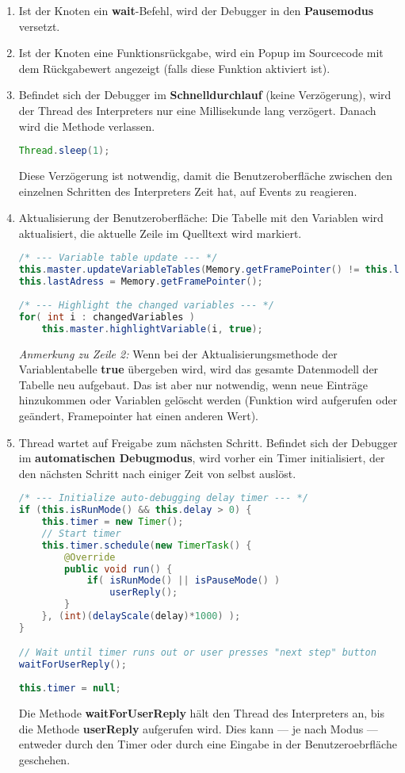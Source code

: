 \begin{enumerate}
\item Ist der Knoten ein \textbf{wait}-Befehl, wird der Debugger in den \textbf{Pausemodus} versetzt.
\item Ist der Knoten eine Funktionsrückgabe, wird ein Popup im Sourcecode mit dem Rückgabewert angezeigt (falls diese Funktion aktiviert ist).
\item Befindet sich der Debugger im \textbf{Schnelldurchlauf} (keine Verzögerung), wird der Thread des Interpreters nur eine Millisekunde lang verzögert. Danach wird die Methode verlassen.
\begin{lstlisting}[language=JAVA]
Thread.sleep(1);
\end{lstlisting}
Diese Verzögerung ist notwendig, damit die Benutzeroberfläche zwischen den einzelnen Schritten des Interpreters Zeit hat, auf Events zu reagieren.

\item Aktualisierung der Benutzeroberfläche: Die Tabelle mit den Variablen wird aktualisiert, die aktuelle Zeile im Quelltext wird markiert.
\begin{lstlisting}[language=JAVA]
/* --- Variable table update --- */
this.master.updateVariableTables(Memory.getFramePointer() != this.lastAdress);
this.lastAdress = Memory.getFramePointer();
		
/* --- Highlight the changed variables --- */
for( int i : changedVariables )
	this.master.highlightVariable(i, true);
\end{lstlisting}
\emph{Anmerkung zu Zeile 2:} Wenn bei der Aktualisierungsmethode der Variablentabelle \textbf{true} übergeben wird, wird das gesamte Datenmodell der Tabelle neu aufgebaut. Das ist aber nur notwendig, wenn neue Einträge hinzukommen oder Variablen gelöscht werden (Funktion wird aufgerufen oder geändert, Framepointer hat einen anderen Wert).

\item Thread wartet auf Freigabe zum nächsten Schritt. Befindet sich der Debugger im \textbf{automatischen Debugmodus}, wird vorher ein Timer initialisiert, der den nächsten Schritt nach einiger Zeit von selbst auslöst.
\begin{lstlisting}[language=JAVA]
/* --- Initialize auto-debugging delay timer --- */
if (this.isRunMode() && this.delay > 0) {
	this.timer = new Timer();
	// Start timer
	this.timer.schedule(new TimerTask() {
		@Override
		public void run() {
			if( isRunMode() || isPauseMode() )
				userReply();
		}
	}, (int)(delayScale(delay)*1000) );
}

// Wait until timer runs out or user presses "next step" button
waitForUserReply();
		
this.timer = null;
\end{lstlisting}
Die Methode \textbf{waitForUserReply} hält den Thread des Interpreters an, bis die Methode \textbf{userReply} aufgerufen wird. Dies kann --- je nach Modus --- entweder durch den Timer oder durch eine Eingabe in der Benutzeroebrfläche geschehen.
\end{enumerate}



